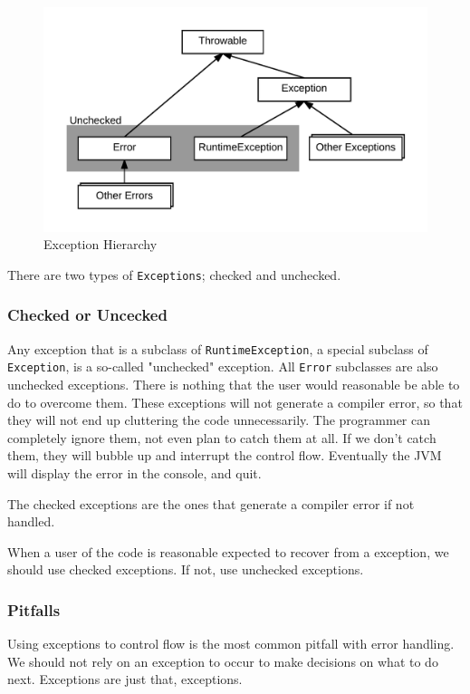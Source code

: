 \begin{figure}[!h]\centering
\includegraphics[width=\linewidth, frame]{images/exceptionhierarchy}
\caption{Exception Hierarchy}
\label{fig:exceptions}
\end{figure}

There are two types of \texttt{Exceptions}; checked and unchecked.

\subsubsection{Checked or Uncecked}
Any exception that is a subclass of \texttt{RuntimeException}, a special subclass of \texttt{Exception}, is a so-called "unchecked" exception. All \texttt{Error} subclasses are also unchecked exceptions. There is nothing that the user would reasonable be able to do to overcome them. These exceptions will not generate a compiler error, so that they will not end up cluttering the code unnecessarily. The programmer can completely ignore them, not even plan to catch them at all. \cite{runtimeexception} If we don't catch them, they will bubble up and interrupt the control flow. Eventually the JVM will display the error in the console, and quit.

The checked exceptions are the ones that generate a compiler error if not handled.

When a user of the code is reasonable expected to recover from a exception, we should use checked exceptions. If not, use unchecked exceptions.\cite{runtimeexception}

\subsubsection{Pitfalls}

Using exceptions to control flow is the most common pitfall with error handling. We should not rely on an exception to occur to make decisions on what to do next. Exceptions are just that, exceptions.

